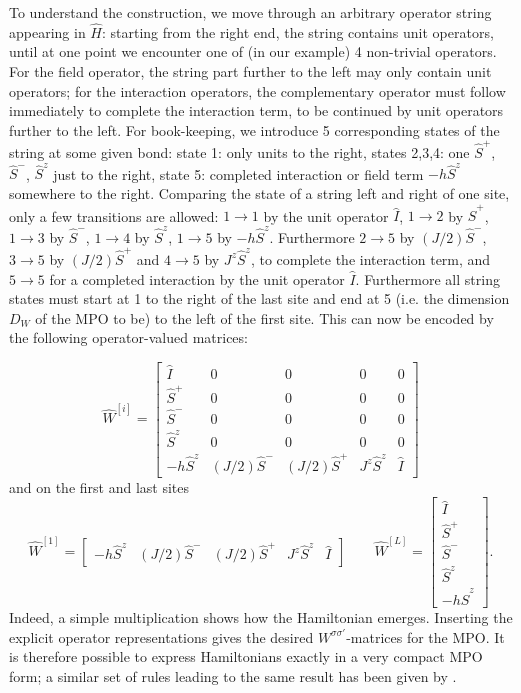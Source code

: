 \documentclass[a4paper,10pt,oneside,onecolumn,1p,times]{elsarticle}
\begin{document}
To understand the construction, we move through an arbitrary operator string appearing in $\hat{H}$: starting from the right end, the string contains unit operators, until at one point we encounter one of (in our example) 4 non-trivial operators. For the field operator, the string part further to the left may only contain unit operators; for the interaction operators, the complementary operator must follow immediately to complete the interaction term, to be continued by unit operators further to the left. For book-keeping, we introduce 5 corresponding states of the string at some given bond: state 1: only units to the right,
states 2,3,4: one $\hat{S}^+$, $\hat{S}^-$, $\hat{S}^z$ just to the right, state 5: completed interaction or field term $-h\hat{S}^z$ somewhere to the right. Comparing the state of a string left and right of one site, only a few transitions are allowed: $1 \rightarrow 1$ by the unit operator $\hat{I}$, $1 \rightarrow 2$ by $\hat{S}^+$, $1 \rightarrow 3$ by $\hat{S}^-$, $1 \rightarrow 4$ by $\hat{S}^z$, $1 \rightarrow 5$ by $-h\hat{S}^z$. Furthermore $2\rightarrow 5$ by $(J/2)\hat{S}^-$, $3 \rightarrow 5$ by $(J/2)\hat{S}^+$ and $4 \rightarrow 5$ by $J^z\hat{S}^z$, to complete the interaction term, and $5 \rightarrow 5$ for a completed interaction by the unit operator $\hat{I}$. Furthermore all string states must start at 1 to the right of the last site and end at 5 (i.e. the dimension $D_W$ of the MPO to be) to the left of the first site. This can now be encoded by the following operator-valued matrices:

\begin{equation}
\hat{W}^{[i]} = \left[
\begin{array}{ccccc}
\hat{I} & 0 & 0 & 0 & 0 \\
\hat{S}^+ & 0 & 0 & 0 & 0 \\
\hat{S}^- & 0 & 0 & 0 & 0 \\
\hat{S}^z & 0 & 0 & 0 & 0 \\
-h\hat{S}^z & (J/2)\hat{S}^- & (J/2)\hat{S}^+ & J^z\hat{S}^z & \hat{I}
\end{array}
\right]
\end{equation}
and on the first and last sites
\begin{equation}
\hat{W}^{[1]} = \left[
\begin{array}{ccccc}
-h\hat{S}^z & (J/2)\hat{S}^- & (J/2)\hat{S}^+ & J^z\hat{S}^z & \hat{I} 
\end{array}
\right]
\quad\quad 
\hat{W}^{[L]} = \left[
\begin{array}{c}
\hat{I} \\ \hat{S}^+ \\ \hat{S}^- \\ \hat{S}^z \\ -h\hat{S}^z 
\end{array}
\right] .
\end{equation}
Indeed, a simple multiplication shows how the Hamiltonian emerges. Inserting the explicit operator representations gives the desired $W^{\sigma\sigma'}$-matrices for the MPO. It is therefore possible to express Hamiltonians exactly in a very compact MPO form; a similar set of rules leading to the same result has been given by \cite{Crosswhite08a}.
\end{document}
